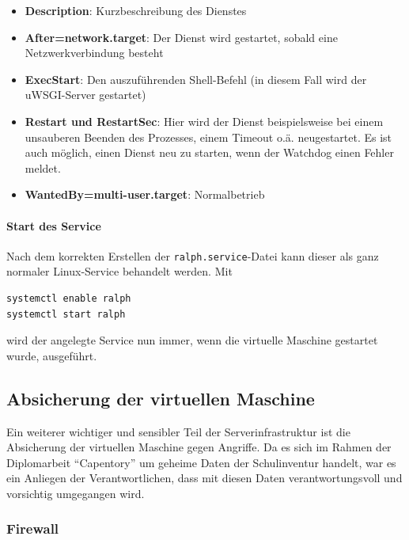 \begin{itemize}
\tightlist
\item
  \textbf{Description}: Kurzbeschreibung des Dienstes
\item
  \textbf{After=network.target}: Der Dienst wird gestartet, sobald eine
  Netzwerkverbindung besteht
\item
  \textbf{ExecStart}: Den auszuführenden Shell-Befehl (in diesem Fall
  wird der uWSGI-Server gestartet)
\item
  \textbf{Restart und RestartSec}: Hier wird der Dienst beispielsweise
  bei einem unsauberen Beenden des Prozesses, einem Timeout o.ä.
  neugestartet. Es ist auch möglich, einen Dienst neu zu starten, wenn
  der Watchdog einen Fehler meldet.
\item
  \textbf{WantedBy=multi-user.target}: Normalbetrieb
\end{itemize}

\hypertarget{start-des-service}{%
\paragraph{Start des Service}\label{start-des-service}}

Nach dem korrekten Erstellen der \texttt{ralph.service}-Datei kann
dieser als ganz normaler Linux-Service behandelt werden. Mit

\begin{verbatim}
systemctl enable ralph
systemctl start ralph
\end{verbatim}

wird der angelegte Service nun immer, wenn die virtuelle Maschine
gestartet wurde, ausgeführt.

\hypertarget{absicherung-der-virtuellen-maschine}{%
\subsection{Absicherung der virtuellen
Maschine}\label{absicherung-der-virtuellen-maschine}}

Ein weiterer wichtiger und sensibler Teil der Serverinfrastruktur ist
die Absicherung der virtuellen Maschine gegen Angriffe. Da es sich im
Rahmen der Diplomarbeit ``Capentory'' um geheime Daten der Schulinventur
handelt, war es ein Anliegen der Verantwortlichen, dass mit diesen Daten
verantwortungsvoll und vorsichtig umgegangen wird.

\hypertarget{firewall}{%
\subsubsection{Firewall}\label{firewall}}

